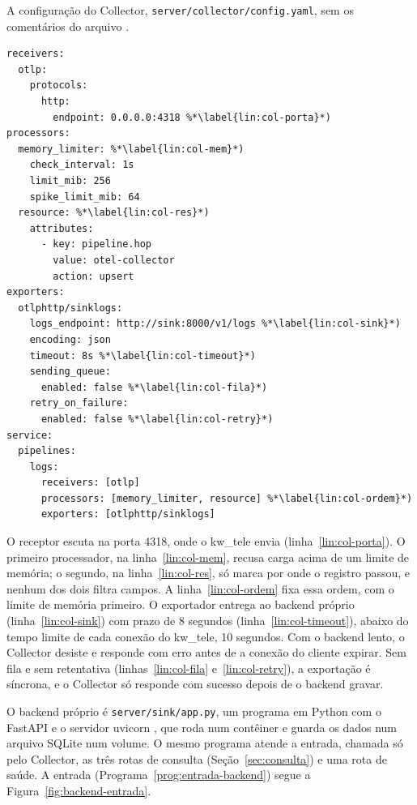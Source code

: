 \begin{programruledcaption}{A configuração do Collector, \texttt{server/\allowbreak{}collector/\allowbreak{}config.yaml},
    sem os comentários do arquivo \citep{kwtelemetry_repo}.
    \label{prog:collector}}
\begin{lstlisting}[style=wider]
receivers:
  otlp:
    protocols:
      http:
        endpoint: 0.0.0.0:4318 %*\label{lin:col-porta}*)
processors:
  memory_limiter: %*\label{lin:col-mem}*)
    check_interval: 1s
    limit_mib: 256
    spike_limit_mib: 64
  resource: %*\label{lin:col-res}*)
    attributes:
      - key: pipeline.hop
        value: otel-collector
        action: upsert
exporters:
  otlphttp/sinklogs:
    logs_endpoint: http://sink:8000/v1/logs %*\label{lin:col-sink}*)
    encoding: json
    timeout: 8s %*\label{lin:col-timeout}*)
    sending_queue:
      enabled: false %*\label{lin:col-fila}*)
    retry_on_failure:
      enabled: false %*\label{lin:col-retry}*)
service:
  pipelines:
    logs:
      receivers: [otlp]
      processors: [memory_limiter, resource] %*\label{lin:col-ordem}*)
      exporters: [otlphttp/sinklogs]
\end{lstlisting}
\end{programruledcaption}

O receptor escuta na porta 4318, onde o kw\_tele envia
(linha~\ref{lin:col-porta}). O primeiro processador, na
linha~\ref{lin:col-mem}, recusa carga acima de um limite de memória; o
segundo, na linha~\ref{lin:col-res}, só marca por onde o registro passou, e
nenhum dos dois filtra campos. A linha~\ref{lin:col-ordem} fixa essa ordem, com
o limite de memória primeiro. O exportador entrega ao backend próprio
(linha~\ref{lin:col-sink}) com prazo de 8 segundos
(linha~\ref{lin:col-timeout}), abaixo do tempo limite de cada conexão do
kw\_tele, 10 segundos. Com o backend lento, o Collector desiste e responde com
erro antes de a conexão do cliente expirar. Sem fila e sem retentativa
(linhas~\ref{lin:col-fila} e~\ref{lin:col-retry}), a exportação é síncrona, e
o Collector só responde com sucesso depois de o backend gravar.

O backend próprio é \texttt{server/sink/app.py}, um programa em Python com o
FastAPI \citep{fastapi_0_115_6} e o servidor uvicorn \citep{uvicorn_0_34_0},
que roda num contêiner e guarda os dados num arquivo SQLite num volume. O mesmo
programa atende a entrada, chamada só pelo Collector, as três rotas de
consulta (Seção~\ref{sec:consulta}) e uma rota de saúde. A entrada
(Programa~\ref{prog:entrada-backend}) segue a Figura~\ref{fig:backend-entrada}.

